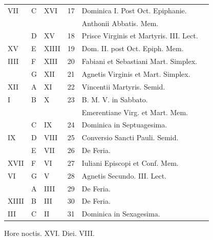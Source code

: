 \begin{center}
\begin{tabular}{l | l | l | r | l l}
\color{Red} VII & C & \color{Red} XVI & 17 & Dominica I. Post Oct. Epiphanie. \\
 &  & & & \quad \color{Red} Anthonii Abbatis. Mem. \\
 & D & \color{Red} XV & 18 & Prisce Virginis et Martyris. III. Lect. \\
\color{Red} XV & E & \color{Red} XIIII & 19 & Dom. II. post Oct. Epiph. Mem. \\
\color{Red} IIII & F & \color{Red} XIII & 20 & \multicolumn{2}{l}{Fabiani et Sebastiani Mart. Simplex.} \\
 & G & \color{Red} XII & 21 & Agnetis Virginis et Mart. Simplex. \\
\color{Red} XII & \color{Red} A & \color{Red} XI & 22 & Vincentii Martyris. Semid. \\
\color{Red} I & B & \color{Red} X & 23 & B. M. V. in Sabbato. \\
 &  & & & \quad \color{Red} Emerentiane Virg. et Mart. Mem. \\
 & C & \color{Red} IX & 24 & \color{Red} Dominica in Septuagesima. \\
\color{Red} IX & D & \color{Red} VIII & 25 & Conversio Sancti Pauli. Semid. \\
& E & \color{Red} VII & 26 & De Feria. & \color{Red} \\
\color{Red} XVII & F & \color{Red} VI & 27 & \color{Red} Iuliani Episcopi et Conf. Mem. \\
\color{Red} VI & G & \color{Red} V & 28 & \color{Red} Agnetis Secundo. III. Lect. \\
 & \color{Red} A & \color{Red} IIII & 29 & De Feria. & \color{Red} \\
\color{Red} XIIII & B & \color{Red} III & 30 & De Feria. & \color{Red} \\
\color{Red} III & C & \color{Red} II & 31 & \color{Red} Dominica in Sexagesima. & \color{Red} \\
\end{tabular}
\color{Red} Hore noctis. XVI. Diei. VIII.
\end{center}



\newpage
\color{Red}\color{black}

